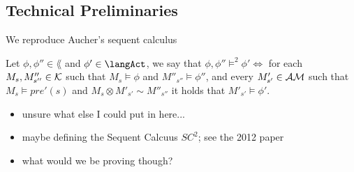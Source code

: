 \subsection{Technical Preliminaries}

We reproduce Aucher's sequent calculus

\begin{defn}
Let $\phi, \phi'' \in \lang$ and $\phi' \in \langAct$, we say that
$\phi, \phi'' \models^2 \phi' \iff$ for each $M_s, M''_{s''} \in \mathcal{K}$
such that $M_s \models \phi$ and $M''_{s''} \models \phi''$, and every $M'_{s'}
\in \mathcal{AM}$ such that $M_s \models pre'(s)$ and $M_s \otimes M'_{s'}
\sim M''_{s''}$ it holds that $M'_{s'} \models \phi'$.
\end{defn}

\begin{itemize}
  \item unsure what else I could put in here...
  \item maybe defining the Sequent Calcuus $SC^2$; see the 2012 paper
  \item what would we be proving though?
\end{itemize}

